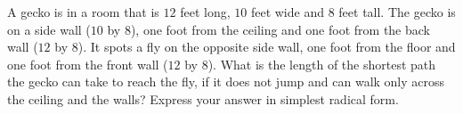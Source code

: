 A gecko is in a room that is $12$ feet long, $10$ feet wide and $8$ feet tall. The gecko is on a side wall ($10$ by $8$), one foot from the ceiling and one foot from the back wall ($12$ by $8$). It spots a fly on the opposite side wall, one foot from the floor and one foot from the front wall ($12$ by $8$). What is the length of the shortest path the gecko can take to reach the fly, if it does not jump and can walk only across the ceiling and the walls? Express your answer in simplest radical form.

